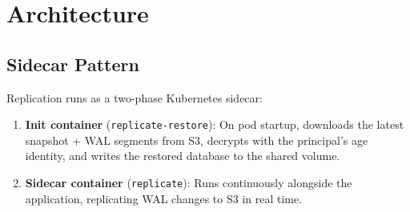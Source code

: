 \section{Architecture}
\label{sec:arch}

\subsection{Sidecar Pattern}\label{sec:sidecar}

Replication runs as a two-phase Kubernetes sidecar:

\begin{enumerate}[nosep]
  \item \textbf{Init container} (\texttt{replicate-restore}): On pod
    startup, downloads the latest snapshot + WAL segments from S3,
    decrypts with the principal's age identity, and writes the
    restored database to the shared volume.
  \item \textbf{Sidecar container} (\texttt{replicate}): Runs
    continuously alongside the application, replicating WAL changes
    to S3 in real time.
\end{enumerate}

